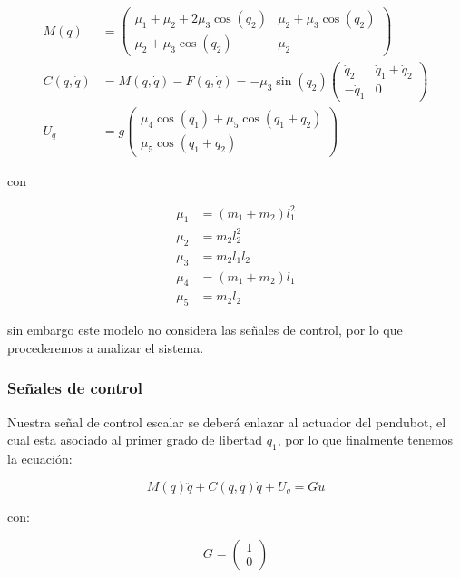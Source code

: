 \documentclass{article}
\begin{document}
\[
\begin{align}
M(q) &=
\begin{pmatrix}
\mu_1 + \mu_2 + 2\mu_3 \cos{(q_2)} & \mu_2 + \mu_3 \cos{(q_2)} \\
\mu_2 + \mu_3 \cos{(q_2)} & \mu_2
\end{pmatrix} \\
C(q, \dot{q}) &= \dot{M}(q, \dot{q}) - F(q, \dot{q}) =
-\mu_3 \sin{(q_2)}
\begin{pmatrix}
\dot{q}_2 & \dot{q}_1 + \dot{q}_2 \\
-\dot{q}_1 & 0
\end{pmatrix} \\
U_q &= g
\begin{pmatrix}
\mu_4 \cos{(q_1)} + \mu_5 \cos{(q_1 + q_2)} \\
\mu_5 \cos{(q_1 + q_2)}
\end{pmatrix}
\end{align}
\]

con

\[
\begin{align}
\mu_1 &= (m_1 + m_2) l_1^2 \\
\mu_2 &= m_2 l_2^2 \\
\mu_3 &= m_2 l_1 l_2 \\
\mu_4 &= \left( m_1 + m_2 \right) l_1 \\
\mu_5 &= m_2 l_2
\end{align}
\]

sin embargo este modelo no considera las señales de control, por lo que
procederemos a analizar el sistema.

    \subsubsection*{Señales de control}\label{seuxf1ales-de-control}

    Nuestra señal de control escalar se deberá enlazar al actuador del
pendubot, el cual esta asociado al primer grado de libertad \(q_1\), por
lo que finalmente tenemos la ecuación:

\[
M(q) \ddot{q} + C(q, \dot{q}) \dot{q} + U_q = G u
\]

con:

\[
G =
\begin{pmatrix}
1 \\
0
\end{pmatrix}
\]
\end{document}

